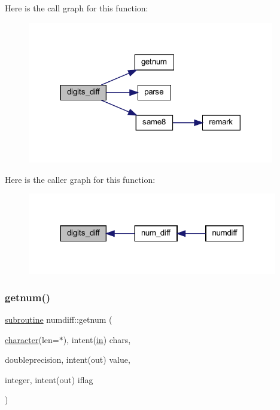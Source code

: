 Here is the call graph for this function\+:
\nopagebreak
\begin{figure}[H]
\begin{center}
\leavevmode
\includegraphics[width=305pt]{numdiff_8f90_a52df4f6514ae8b40384687c5e7a94445_cgraph}
\end{center}
\end{figure}
Here is the caller graph for this function\+:
\nopagebreak
\begin{figure}[H]
\begin{center}
\leavevmode
\includegraphics[width=309pt]{numdiff_8f90_a52df4f6514ae8b40384687c5e7a94445_icgraph}
\end{center}
\end{figure}
\mbox{\label{numdiff_8f90_aaeae7de323a14e4d927224585b530d90}} 
\subsubsection{\texorpdfstring{getnum()}{getnum()}}
{\footnotesize\ttfamily \hyperlink{M__stopwatch_83_8txt_acfbcff50169d691ff02d4a123ed70482}{subroutine} numdiff\+::getnum (\begin{DoxyParamCaption}\item[{\hyperlink{option__stopwatch_83_8txt_abd4b21fbbd175834027b5224bfe97e66}{character}(len=$\ast$), intent(\hyperlink{M__journal_83_8txt_afce72651d1eed785a2132bee863b2f38}{in})}]{chars,  }\item[{doubleprecision, intent(out)}]{value,  }\item[{integer, intent(out)}]{iflag }\end{DoxyParamCaption})}

